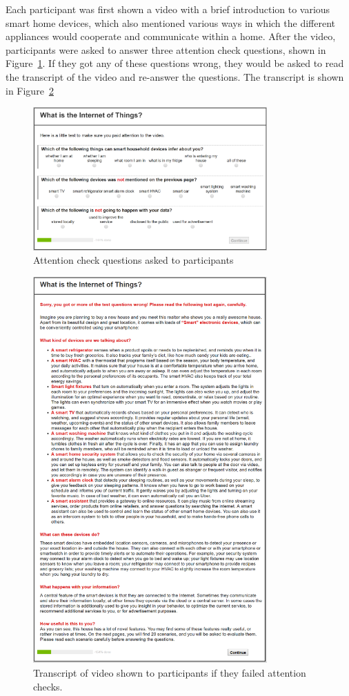 Each participant was first shown a video with a brief introduction to various smart home devices, which also mentioned various ways in which the different appliances would cooperate and communicate within a home. After the video, participants were asked to answer three attention check questions, shown in Figure~\ref{fig:attn1}. If they got any of these questions wrong, they would be asked to read the transcript of the video and re-answer the questions. The transcript is shown in Figure~\ref{fig:attn2}

\begin{figure}
	\centering
	\includegraphics[width=0.8\textwidth]{figures/attn1.PNG}
	\caption{Attention check questions asked to participants}
	\label{fig:attn1}
\end{figure}

\begin{figure}
	\centering
	\includegraphics[width=0.8\textwidth]{figures/attn2.PNG}
	\caption{Transcript of video shown to participants if they failed attention checks.}
	\label{fig:attn2}
\end{figure}

